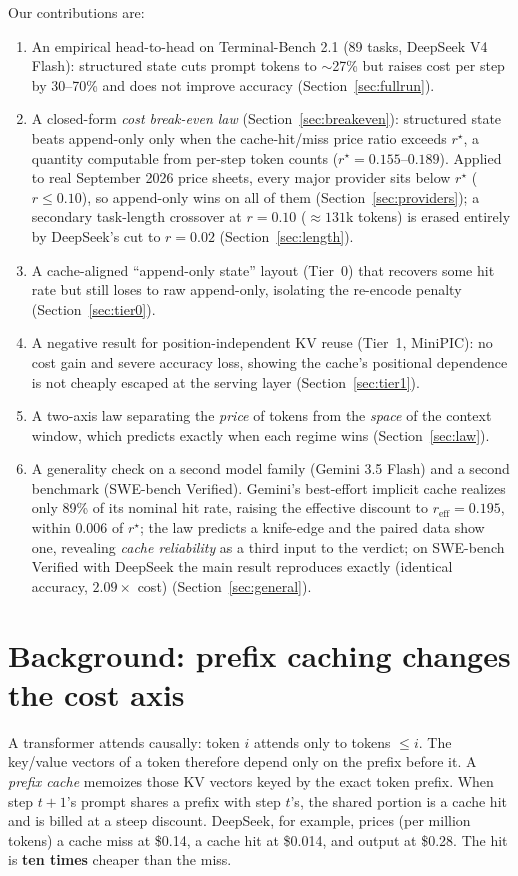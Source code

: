 \documentclass[11pt]{article}
\begin{document}
Our contributions are:
\begin{enumerate}[leftmargin=*,itemsep=2pt]
\item An empirical head-to-head on Terminal-Bench 2.1 (89 tasks, DeepSeek V4
Flash): structured state cuts prompt tokens to $\sim$27\% but raises cost per
step by 30--70\% and does not improve accuracy (Section~\ref{sec:fullrun}).
\item A closed-form \emph{cost break-even law} (Section~\ref{sec:breakeven}):
structured state beats append-only only when the cache-hit/miss price ratio
exceeds $r^\star$, a quantity computable from per-step token counts
($r^\star=0.155$--$0.189$). Applied to real September 2026 price sheets, every
major provider sits below $r^\star$ ($r\le0.10$), so append-only wins on all of
them (Section~\ref{sec:providers}); a secondary task-length crossover at
$r=0.10$ ($\approx131$k tokens) is erased entirely by DeepSeek's cut to $r=0.02$
(Section~\ref{sec:length}).
\item A cache-aligned ``append-only state'' layout (Tier~0) that recovers some
hit rate but still loses to raw append-only, isolating the re-encode penalty
(Section~\ref{sec:tier0}).
\item A negative result for position-independent KV reuse (Tier~1, MiniPIC):
no cost gain and severe accuracy loss, showing the cache's positional
dependence is not cheaply escaped at the serving layer
(Section~\ref{sec:tier1}).
\item A two-axis law separating the \emph{price} of tokens from the \emph{space}
of the context window, which predicts exactly when each regime wins
(Section~\ref{sec:law}).
\item A generality check on a second model family (Gemini 3.5 Flash) and a
second benchmark (SWE-bench Verified). Gemini's best-effort implicit cache
realizes only 89\% of its nominal hit rate, raising the effective discount to
$r_{\text{eff}}=0.195$, within $0.006$ of $r^\star$; the law predicts a
knife-edge and the paired data show one, revealing \emph{cache reliability} as a
third input to the verdict; on SWE-bench Verified with DeepSeek the main
result reproduces exactly (identical accuracy, $2.09\times$ cost)
(Section~\ref{sec:general}).
\end{enumerate}

\section{Background: prefix caching changes the cost axis}
\label{sec:bg}
A transformer attends causally: token $i$ attends only to tokens $\le i$. The
key/value vectors of a token therefore depend only on the prefix before it. A
\emph{prefix cache} memoizes those KV vectors keyed by the exact token prefix.
When step $t{+}1$'s prompt shares a prefix with step $t$'s, the shared portion is
a cache hit and is billed at a steep discount. DeepSeek, for example, prices
(per million tokens) a cache miss at \$0.14, a cache hit at \$0.014, and output
at \$0.28. The hit is \textbf{ten times} cheaper than the miss.
\end{document}
